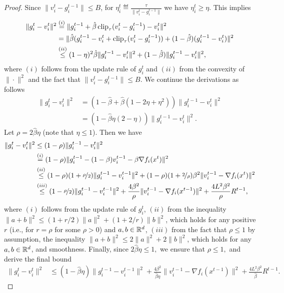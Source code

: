\documentclass[a4paper,11pt]{article}
\begin{document}
\begin{proof}
    Since $\|v_i^t-g_i^{t-1}\|\le B$, for $\eta^t_i \eqdef \frac{\tau}{\|v_i^t-g_i^{t-1}\|}$ we have $\eta^t_i \ge \eta$. This implies
    \begin{align*}
        \|g_i^{t} - v_i^{t}\|^2 &\overset{(i)}{=} \|g_i^{t-1} + \hat{\beta}\operatorname{clip}_{\tau}(v_i^t - g_i^{t-1}) - v_i^t\|^2\\
        &= \|\hat{\beta}(g_i^{t-1} - v_i^t + \operatorname{clip}_{\tau}(v_i^t - g_i^{t-1})) + (1-\hat{\beta})(g_i^{t-1} - v_i^t)\|^2\\
        &\overset{(ii)}{\le} (1-\eta)^2\hat{\beta}\|g_i^{t-1}-v_i^t\|^2 
        + (1-\hat{\beta})\|g_i^{t-1}-v_i^t\|^2,
    \end{align*}
    where $(i)$ follows from the update rule of $g_i^t$ and $(ii)$ from the convexity of $\|\cdot\|^2$ and the fact that $\|v_i^t - g_i^{t-1}\| \le B.$ We continue the derivations as follows
    \begin{align*}
        \|g_i^{t} - v_i^{t}\|^2  
        &= (1-\hat{\beta} + \hat{\beta}(1-2\eta + \eta^2))\|g_i^{t-1} - v_i^t\|^2\\
        &=  (1-\hat{\beta}\eta(2-\eta))\|g_i^{t-1} - v_i^t\|^2.
    \end{align*}
    Let $\rho = 2\hat{\beta}\eta$ (note that $\eta \le 1$). Then we have
    \begin{align*}
        \|g_i^{t} - v_i^{t}\|^2  &\le (1-\rho)\|g_i^{t-1} - v_i^t\|^2\\
        &\overset{(i)}{=} (1-\rho)\|g_i^{t-1} - (1-\beta)v_i^{t-1} - \beta\nabla f_i(x^t)\|^2 \\
        &\overset{(ii)}{\le} (1-\rho)(1+\nicefrac{\rho}{2})\|g_i^{t-1} - v_i^{t-1}\|^2
        + (1-\rho)(1+\nicefrac{2}{\rho})\beta^2\|v_i^{t-1} - \nabla f_i(x^t)\|^2\\
        &\overset{(iii)}{\le} (1-\nicefrac{\rho}{2})\|g_i^{t-1} - v_i^{t-1}\|^2
        + \frac{4\beta^2}{\rho}\|v_i^{t-1} - \nabla f_i(x^{t-1})\|^2
        + \frac{4L^2\beta^2}{\rho}R^{t-1},
    \end{align*}
    where $(i)$ follows from the update rule of $g_i^t$, $(ii)$ from the inequality $\|a+b\|^2\le(1+r/2)\|a\|^2 + (1+2/r)\|b\|^2$, which holds for any positive $r$ (i.e., for $r = \rho$ for some $\rho>0$) and $a,b\in \mathbb{R}^d$, $(iii)$ from the fact that $\rho \le 1$ by assumption, the inequality $\|a+b\|^2\le 2\|a\|^2 + 2\|b\|^2$, which holds for any $a,b\in \mathbb{R}^d$, and smoothness. Finally, since $2\hat{\beta}\eta \le 1,$ we ensure that $\rho \le 1,$ and derive the final bound
    \begin{align*}
        \|g_i^{t} - v_i^{t}\|^2 &\le (1-\hat{\beta}\eta)\|g_i^{t-1} - v_i^{t-1}\|^2
        + \frac{4\beta^2}{\hat{\beta}\eta}\|v_i^{t-1} - \nabla f_i(x^{t-1})\|^2
        + \frac{4L^2\beta^2}{\hat{\beta}}R^{t-1}.
    \end{align*}
\end{proof}
\end{document}
